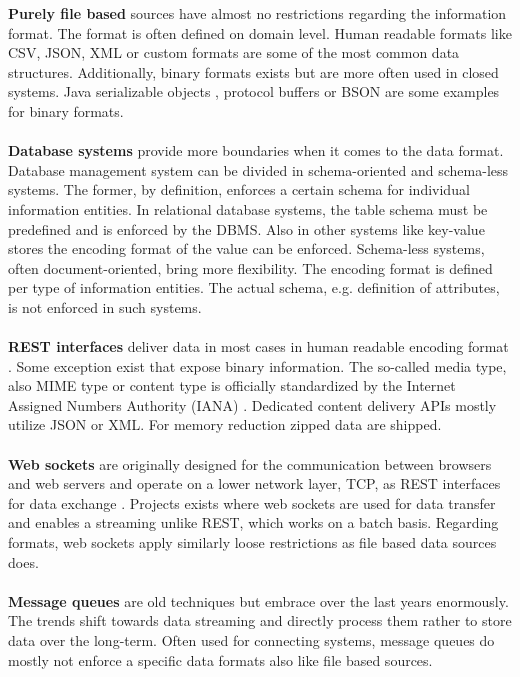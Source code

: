 \noindent\textbf{Purely file based} sources have almost no restrictions regarding the information format. The format is often defined on domain level. Human readable formats like CSV, JSON, XML or custom formats are some of the most common data structures. Additionally, binary formats exists but are more often used in closed systems. Java serializable objects \cite{serializable_objects_2017}, protocol buffers \cite{protocol_buffers_2017} or BSON \cite{bson_2017} are some examples for binary formats.
\\\\
\textbf{Database systems} provide more boundaries when it comes to the data format. Database management system can be divided in schema-oriented and schema-less systems. The former, by definition, enforces a certain schema for individual information entities. In relational database systems, the table schema must be predefined and is enforced by the DBMS. Also in other systems like key-value stores the encoding format of the value can be enforced. Schema-less systems, often document-oriented, bring more flexibility. The encoding format is defined per type of information entities. The actual schema, e.g. definition of attributes, is not enforced in such systems.
\\\\
\textbf{REST interfaces} deliver data in most cases in human readable encoding format \cite{rest_2017}. Some exception exist that expose binary information. The so-called media type, also MIME type or content type is officially standardized by the Internet Assigned Numbers Authority (IANA) \cite{media_types_2017}. Dedicated content delivery APIs mostly utilize JSON or XML. For memory reduction zipped data are shipped. 
\\\\
\textbf{Web sockets} are originally designed for the communication between browsers and web servers and operate on a lower network layer, TCP, as REST interfaces for data exchange \cite{websocket_2017}. Projects exists where web sockets are used for data transfer and enables a streaming unlike REST, which works on a batch basis. Regarding formats, web sockets apply similarly loose restrictions as file based data sources does.
\\\\
\textbf{Message queues} are old techniques but embrace over the last years enormously. The trends shift towards data streaming and directly process them rather to store data over the long-term. Often used for connecting systems, message queues do mostly not enforce a specific data formats also like file based sources.

